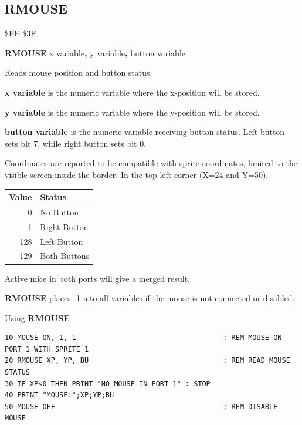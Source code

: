 \subsection{RMOUSE}
\begin{description}[leftmargin=2cm,style=nextline]
\item [Token:]    \$FE \$3F

\item [Format:]   {\bf RMOUSE} x variable{\bf,} y variable{\bf,} button variable

\item [Usage:]    Reads mouse position and button status.

                  {\bf x variable} is the numeric variable where the x-position will be stored.

                  {\bf y variable} is the numeric variable where the y-position will be stored.

                  {\bf button variable} is the numeric variable receiving button status. Left button sets bit 7, while right button sets bit 0.

                  Coordinates are reported to be compatible with sprite coordinates, limited to the visible screen inside the border. In the top-left corner (X=24 and Y=50).

                  \begin{center}
                  {\setlength{\tabcolsep}{1mm}
                  \begin{tabular}{|r|l|}
                  \hline
                  {\bf Value} & {\bf Status} \\
                  \hline
                  0   & No Button \\
                  1   & Right Button \\
                  128 & Left Button \\
                  129 & Both Buttons \\
                  \hline
                  \end{tabular}
                  }
                  \end{center}

\item [Remarks:]  Active mice in both ports will give a merged result.

                  {\bf RMOUSE} places -1 into all variables if the mouse is not connected or disabled.

\item [Example:]  Using {\bf RMOUSE}

\begin{tcolorbox}[colback=black,coltext=white]
\verbatimfont{\codefont}
\begin{verbatim}
10 MOUSE ON, 1, 1                                   : REM MOUSE ON PORT 1 WITH SPRITE 1
20 RMOUSE XP, YP, BU                                : REM READ MOUSE STATUS
30 IF XP<0 THEN PRINT "NO MOUSE IN PORT 1" : STOP
40 PRINT "MOUSE:";XP;YP;BU
50 MOUSE OFF                                        : REM DISABLE MOUSE
\end{verbatim}
\end{tcolorbox}
\end{description}

